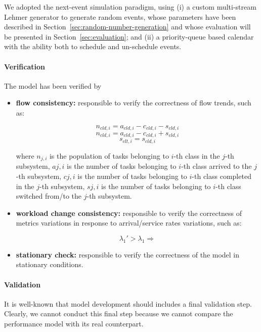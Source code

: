 We adopted the next-event simulation paradigm, using 
(i) a custom multi-stream Lehmer generator to generate random events, whose parameters have been described in Section~\ref{sec:random-number-generation} and whose evaluation will be presented in Section~\ref{sec:evaluation}; and
(ii) a priority-queue based calendar with the ability both to schedule and un-schedule events.


\paragraph{Verification}
The model has been verified by 
\begin{itemize}
	\item \textbf{flow consistency:} responsible to verify the correctness of flow trends, such as:
	
	\begin{equation}
	n_{cld,i}=a_{cld,i}-c_{cld,i}-s_{cld,i}
	\end{equation}
	\begin{equation}
	n_{cld,i}=a_{cld,i}-c_{cld,i}+s_{cld,i}
	\end{equation}
	\begin{equation}
	s_{clt,i}=s_{cld,i}
	\end{equation}
	
	 where 
	 $n_{j,i}$ is the population of tasks belonging to $i$-th class in the $j$-th subsystem, 
	 $a{j,i}$ is the number of tasks belonging to $i$-th class arrived to the $j$-th subsystem, 
	 $c{j,i}$ is the number of tasks belonging to $i$-th class completed in the $j$-th subsystem, 
	 $s{j,i}$ is the number of tasks belonging to $i$-th class switched from/to the $j$-th subsystem.
	 
	\item \textbf{workload change consistency:} responsible to verify the correctness of metrics variations in response to arrival/service rates variations, such as:
	
	\begin{equation}
		\lambda_{1}' > \lambda_{1} \Rightarrow
	\end{equation}
	
	\item \textbf{stationary check:} responsible to verify the correctness of the model in stationary conditions.
\end{itemize}

\paragraph{Validation}
It is well-known that model development should includes a final validation step. Clearly, we cannot conduct this final step because we cannot compare the performance model with its real counterpart.